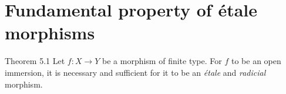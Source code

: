 \section{Fundamental property of \'{e}tale morphisms}
\label{I.5}

\begin{itenv}{Theorem 5.1}
\label{I.5.1}
  Let $f\colon X\to Y$ be a morphism of finite type.
  For $f$ to be an open immersion, it is necessary and sufficient for it to be an \emph{\'{e}tale} and \emph{radicial} morphism.
\end{itenv}
